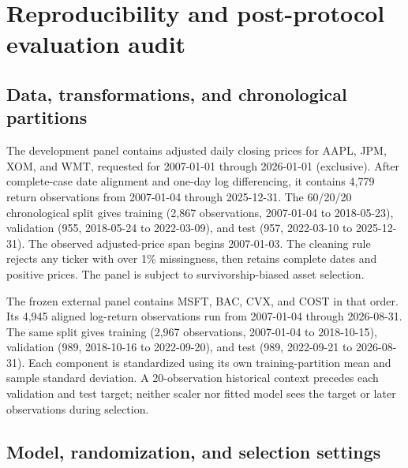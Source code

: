 \documentclass[11pt]{article}
\begin{document}
\newpage
\appendix

\section{Reproducibility and post-protocol evaluation audit}

\subsection{Data, transformations, and chronological partitions}

The development panel contains adjusted daily closing prices for AAPL, JPM,
XOM, and WMT, requested for 2007-01-01 through 2026-01-01 (exclusive). After
complete-case date alignment and one-day log differencing, it contains 4,779
return observations from 2007-01-04 through 2025-12-31. The 60/20/20
chronological split gives training (2,867 observations, 2007-01-04 to
2018-05-23), validation (955, 2018-05-24 to 2022-03-09), and test (957,
2022-03-10 to 2025-12-31). The observed adjusted-price span begins
2007-01-03. The cleaning rule rejects any ticker with over 1\% missingness,
then retains complete dates and positive prices. The panel is subject to
survivorship-biased asset selection.

The frozen external panel contains MSFT, BAC, CVX, and COST in that order.
Its 4,945 aligned log-return observations run from 2007-01-04 through
2026-08-31. The same split gives training (2,967 observations, 2007-01-04 to
2018-10-15), validation (989, 2018-10-16 to 2022-09-20), and test (989,
2022-09-21 to 2026-08-31). Each component is standardized using its own
training-partition mean and sample standard deviation. A 20-observation
historical context precedes each validation and test target; neither scaler
nor fitted model sees the target or later observations during selection.

\subsection{Model, randomization, and selection settings}
\end{document}
